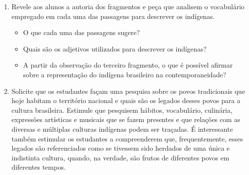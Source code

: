 \documentclass{extrarticle}
\begin{document}
\begin{enumerate}
\begin{quote}
\begin{enumerate}
\setcounter{enumii}{2}
\item A feição deles é serem pardos, maneira de avermelhados, de bons
rostos e bons narizes, bem-feitos. Andam nus, sem nenhuma cobertura.
Nem estimam de cobrir ou de mostrar suas vergonhas; e nisso têm
tanta inocência como em mostrar o rosto. Ambos traziam os beiços de
baixo furados e metidos neles seus ossos brancos e verdadeiros, de
comprimento duma mão travessa, da grossura dum fuso de algodão,
agudos na ponta como um furador. Metem-nos pela parte de dentro do
beiço; e a parte que lhes fica entre o beiço e os dentes é feita
como roque de xadrez, ali encaixado de tal sorte que não os molesta,
nem os estorva no falar, no comer ou no beber {[}\ldots{}{]}\footnote{CAMINHA, Pero Vaz. \emph{A carta}. Disponível em:
\textless{}\href{http://www.dominiopublico.gov.br/pesquisa/DetalheObraForm.do?select_action=\&co_obra=17424}{\emph{http://www.dominiopublico.gov.br/pesquisa/DetalheObraForm.do?select\_action=\&co\_obra=17424}}\textgreater{},
acesso em 20 de fevereiro de 2021.}
\end{enumerate}
\end{quote}

A partir dessas três leituras, proponha uma reflexão sobre como são
retratados os indígenas, estimule que os alunos partilhem suas
experiências e conhecimentos acumulados. Chame a atenção para o
terceiro fragmento e pergunte a eles o que particulariza essa
descrição em contraponto às outras duas.

\item Revele aos alunos a autoria dos fragmentos e peça que analisem o
vocabulário empregado em cada uma das passagens para descrever os
indígenas.

\begin{itemize}
\item
  O que cada uma das passagens sugere?
\item
  Quais são os adjetivos utilizados para descrever os indígenas?
\item
  A partir da observação do terceiro fragmento, o que é possível afirmar
  sobre a representação do indígena brasileiro na contemporaneidade?
\end{itemize}

\item Solicite que os estudantes façam uma pesquisa sobre os povos
tradicionais que hoje habitam o território nacional e quais são os
legados desses povos para a cultura brasileira. Estimule que
pesquisem hábitos, vocabulário, culinária, expressões artísticas e
musicais que se fazem presentes e que relações com as diversas e
múltiplas culturas indígenas podem ser traçadas. É interessante
também estimular os estudantes a compreenderem que, frequentemente,
esses legados são referenciados como se tivessem sido herdados de
uma única e indistinta cultura, quando, na verdade, são frutos de
diferentes povos em diferentes tempos.
\end{enumerate}
\end{document}
